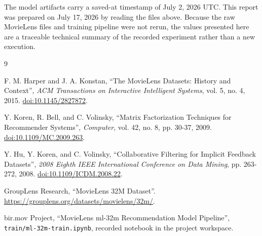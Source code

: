 \documentclass[11pt,a4paper]{article}
\newcommand{\file}[1]{\nolinkurl{#1}}
\begin{document}
The model artifacts carry a saved-at timestamp of July 2, 2026 UTC. This report was prepared on July 17, 2026 by reading the files above. Because the raw MovieLens files and training pipeline were not rerun, the values presented here are a traceable technical summary of the recorded experiment rather than a new execution.

\begin{thebibliography}{9}

F. M. Harper and J. A. Konstan,
\enquote{The MovieLens Datasets: History and Context},
\textit{ACM Transactions on Interactive Intelligent Systems}, vol. 5, no. 4, 2015.
\href{https://doi.org/10.1145/2827872}{doi:10.1145/2827872}.

Y. Koren, R. Bell, and C. Volinsky,
\enquote{Matrix Factorization Techniques for Recommender Systems},
\textit{Computer}, vol. 42, no. 8, pp. 30-37, 2009.
\href{https://doi.org/10.1109/MC.2009.263}{doi:10.1109/MC.2009.263}.

Y. Hu, Y. Koren, and C. Volinsky,
\enquote{Collaborative Filtering for Implicit Feedback Datasets},
\textit{2008 Eighth IEEE International Conference on Data Mining}, pp. 263-272, 2008.
\href{https://doi.org/10.1109/ICDM.2008.22}{doi:10.1109/ICDM.2008.22}.

GroupLens Research,
\enquote{MovieLens 32M Dataset}.
\url{https://grouplens.org/datasets/movielens/32m/}.

bir.mov Project,
\enquote{MovieLens ml-32m Recommendation Model Pipeline},
\file{train/ml-32m-train.ipynb}, recorded notebook in the project workspace.

\end{thebibliography}
\end{document}
